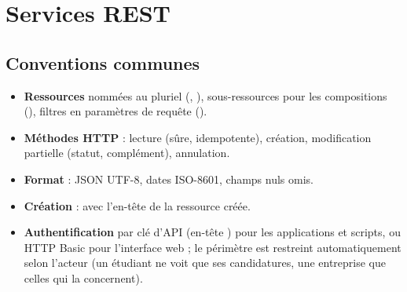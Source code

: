 \chapter{Services REST}\label{chap:rest}

\section{Conventions communes}
\begin{itemize}
  \item \textbf{Ressources} nommées au pluriel (, ), sous-ressources pour les
        compositions (), filtres en paramètres de requête ().
  \item \textbf{Méthodes HTTP} :  lecture (sûre, idempotente),  création,  modification
        partielle (statut, complément),  annulation.
  \item \textbf{Format} : JSON UTF-8, dates ISO-8601, champs nuls omis.
  \item \textbf{Création} :  avec l'en-tête  de la ressource créée.
  \item \textbf{Authentification} par clé d'API (en-tête ) pour les applications et scripts, ou
        HTTP Basic pour l'interface web ; le périmètre est restreint automatiquement selon l'acteur
        (un étudiant ne voit que ses candidatures, une entreprise que celles qui la concernent).
\end{itemize}

